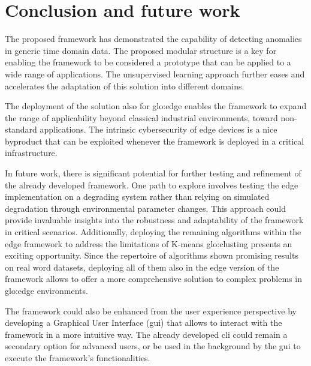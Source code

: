\chapter{Conclusion and future work}
\label{ch:Conclusion}

The proposed framework has demonstrated the capability of detecting anomalies in generic time domain data. The proposed modular structure is a key for enabling the framework to be considered a prototype that can be applied to a wide range of applications. The unsupervised learning approach further eases and accelerates the adaptation of this solution into different domains. 

The deployment of the solution also for \gls{glo:edge} enables the framework to expand the range of applicability beyond classical industrial environments, toward non-standard applications. The intrinsic cybersecurity of edge devices is a nice byproduct that can be exploited whenever the framework is deployed in a critical infrastructure.

In future work, there is significant potential for further testing and refinement of the already developed framework. One path to explore involves testing the edge implementation on a degrading system rather than relying on simulated degradation through environmental parameter changes. This approach could provide invaluable insights into the robustness and adaptability of the framework in critical scenarios. Additionally, deploying the remaining algorithms within the edge framework to address the limitations of K-means \gls{glo:clust}ing presents an exciting opportunity. Since the repertoire of algorithms shown promising results on real word datasets, deploying all of them also in the edge version of the framework allows to offer a more comprehensive solution to complex problems in \gls{glo:edge} environments.

The framework could also be enhanced from the user experience perspective by developing a Graphical User Interface (\gls{gui}) that allows to interact with the framework in a more intuitive way. The already developed \gls{cli} could remain a secondary option for advanced users, or be used in the background by the \gls{gui} to execute the framework's functionalities. 